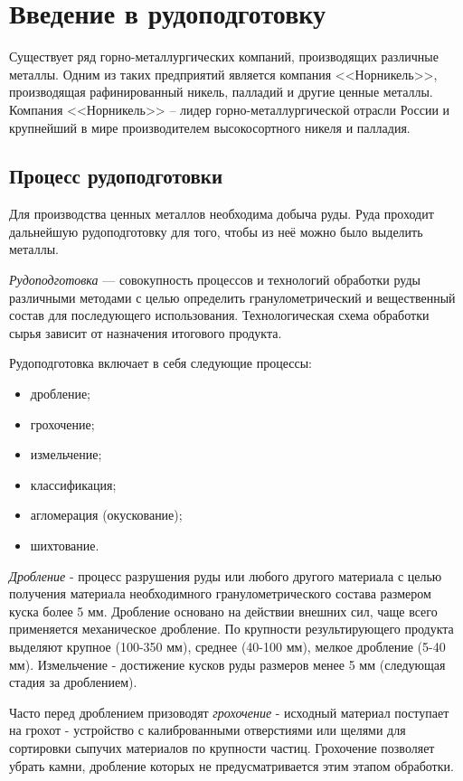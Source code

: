 \documentclass[times]{itmo-student-thesis}
\begin{document}
\section{Введение в рудоподготовку}
Существует ряд горно-металлургических компаний, производящих различные металлы. Одним из таких предприятий является компания <<Норникель>>, производящая рафинированный никель, палладий и другие ценные металлы\cite{nornikel}. Компания <<Норникель>> -- лидер горно-металлургической отрасли России и   крупнейший в мире производителем высокосортного никеля и палладия. 

\subsection{Процесс рудоподготовки}
Для производства ценных металлов необходима добыча руды. Руда проходит дальнейшую рудоподготовку для того, чтобы из неё можно было выделить металлы\cite{rudopodgotovka}. 

\textit{Рудоподготовка } --- совокупность процессов и технологий обработки руды различными методами с целью определить гранулометрический и вещественный состав для последующего использования. Технологическая схема обработки сырья  зависит от назначения итогового продукта. 

Рудоподготовка включает в себя следующие процессы: 
\begin{itemize}
\item дробление;
\item грохочение;
\item измельчение;
\item классификация;
\item агломерация (окускование);
\item шихтование.
\end{itemize}

\textit{Дробление} - процесс разрушения руды или любого другого материала с целью получения материала необходимного гранулометрического состава размером куска более 5 мм. Дробление основано на действии внешних сил, чаще всего применяется механическое дробление. По крупности результирующего продукта выделяют крупное (100-350 мм), среднее (40-100 мм), мелкое дробление (5-40 мм).  Измельчение - достижение кусков руды размеров менее 5 мм (следующая стадия за дроблением).

Часто перед дроблением призоводят \textit{грохочение} - исходный материал поступает на грохот - устройство с калиброванными отверстиями или щелями для сортировки сыпучих материалов по крупности частиц. Грохочение позволяет убрать камни, дробление которых не предусматривается этим этапом обработки.
\end{document}

